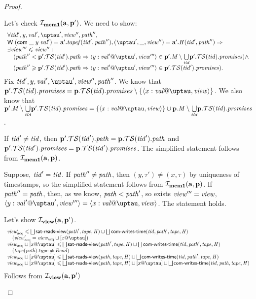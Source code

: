 \begin{proof}
\begin{itemize}
Let's check $\mathcal{I}_{\rm \bf mem1}(\mathbf{a}, \mathbf{p}')$.
We need to show:
\[\begin{array}{l}
  \forall \tId', y, \stval', \tau', \R'', \cpath'', \\
  \tapeWrite{(\tapeWriteCommitted{\_}{y}{\stval'})} = \aT'.\tapef(\tId', \cpath''),
    (\tau', \_, \R'') = \aT'.\hmap(\tId', \cpath'') => \\
  \exists \R''' \le \R'': \\
  \quad (\cpath'' <   \p'.\TSfprom(\tId').\cpath => \writeEvt{y}{\stval'}{\tau'}{\R'''} \in
      \p'.\Mprom \setminus \underset{\tId}{\bigcup} \p'.\TSfprom(\tId).\PromSet) \land \\
  \quad (\cpath'' \ge \p'.\TSfprom(\tId').\cpath => \writeEvt{y}{\stval'}{\tau'}{\R'''} \in \p'.\TSfprom(\tId').\PromSet).\\
\end{array}\]
  Fix $\tId', y, \stval', \tau', \R'', \cpath''$.
  We know that
  $\p'.\TSfprom(\tId).\PromSet = \p.\TSfprom(\tId).\PromSet \setminus \{ \writeEvt{x}{\stval}{\tau}{\R} \}$.
  We also know that
  $\p'.\Mprom \setminus \underset{\tId}{\bigcup} \p'.\TSfprom(\tId).\PromSet = \{ \writeEvt{x}{\stval}{\tau}{\R} \} \cup \p.\Mprom \setminus \underset{\tId}{\bigcup} \p.\TSfprom(\tId).\PromSet$.
    
  If $\mathit{tid}' \not = \mathit{tid}$, then
    $\mathbf{p}'.\mathcal{TS}(\mathit{tid}').\mathit{path} = \mathbf{p}.\mathcal{TS}(\mathit{tid}').\mathit{path}$ and
    $\mathbf{p}'.\mathcal{TS}(\mathit{tid}').\mathit{promises} = \mathbf{p}.\mathcal{TS}(\mathit{tid}').\mathit{promises}$.
  The simplified statement follows from $\mathcal{I}_{\rm \bf mem1}(\mathbf{a}, \mathbf{p})$.
  
  Suppose, $\mathit{tid}' = \mathit{tid}$. If $\mathit{path}'' \not = \mathit{path}$, then $(y, \tau') \not = (x, \tau)$ by uniqueness of timestamps,
  so the simplified statement follows from $\mathcal{I}_{\rm \bf mem1}(\mathbf{a}, \mathbf{p})$.
  If $\mathit{path}'' = \mathit{path}$, then, as we know, $\mathit{path} < \mathit{path}'$, so exists $\mathit{view}''' = \mathit{view}$,
  $\writeEvt{y}{\stval'}{\tau'}{\R'''} = \writeEvt{x}{\stval}{\tau}{\R}$. The statement holds.
  

  Let's show $\mathcal{I}_{\rm \bf view} (\mathbf{a}, \mathbf{p}')$.
  \[\begin{array}{l}
    \Racq' \le \bigsqcup \readsSatisfiedR(\cpath', \tape, \hmap) \sqcup \bigsqcup \opstau(\tId, \cpath', \tape, \hmap) \\
    \quad (\Racq' = \Racq \sqcup [x@\tau]) \\
    \Racq \sqcup [x@\tau]
      \le \bigsqcup \readsSatisfiedR(\cpath', \tape, \hmap) \sqcup \bigsqcup \opstau(\tId, \cpath', \tape, \hmap) \\
    \quad (\tape(\cpath).type \not = Read) \\
    \Racq \sqcup [x@\tau]
      \le \bigsqcup \readsSatisfiedR(\cpath, \tape, \hmap) \sqcup \bigsqcup \opstau(\tId, \cpath', \tape, \hmap) \\
    \Racq \sqcup [x@\tau]
      \le \bigsqcup \readsSatisfiedR(\cpath, \tape, \hmap) \sqcup [x@\tau] \sqcup \bigsqcup \opstau(\tId, \cpath, \tape, \hmap) \\
  \end{array}\]
  Follows from $\mathcal{I}_{\rm \bf view}(\mathbf{a}, \mathbf{p}')$


\end{itemize}
\end{proof}
